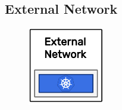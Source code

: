 \subsection{External Network}
\label{subsec:architecture_network_external_network}

\begin{figure}
  \centering
  \includegraphics[width=\linewidth]{images/architecture/external_network.pdf}
\end{figure}

